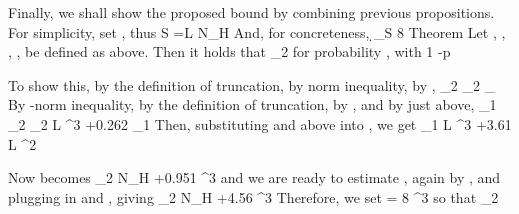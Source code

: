 Finally, we shall show the proposed bound by combining previous propositions.
For simplicity, set , thus
%
 {
S
=L \log N_H \NR
}
%
And, for concreteness,
%
 {
\d_S
\leq {} {8} \NR
}
%
\Result
{Theorem}
{
Let , , , ,  be defined as above.
Then it holds that
%
 {
 _2
\eqsim {}  \NR
}
%
for probability , with
%
 {
1 -p
\eqsim {}  \NR
}
}

To show this, by the definition of truncation, by  norm inequality, by ,
%
 {
 _2
\leq {} _2 \NR
%
\leq {}  _\infty \NR
%
  \NR
}
%
By -norm inequality, by the definition of truncation, by , and by  just above,
%
 {
 _1
\leq {}  _2 \NR
%
\leq {}  _2 \NR
%
 L ^3
+0.262  _1 \NR
}
%
Then, substituting  and  above into , we get
 {
 _1
%
 L ^3 +3.61 L ^2 \NR
}

Now  becomes
%
 {
 _2
%
  \log N_H +0.951  ^3 \NR
}
and we are ready to estimate , again by , and plugging in  and , giving
 {
 _2
  \log N_H +4.56  ^3 \NR
}
Therefore, we set
 {
\chi
= 8  ^3 \NR
}
so that
 {
 _2
\leq \chi \NR
}

